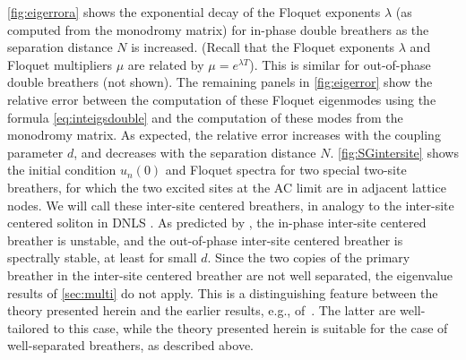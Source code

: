 \documentclass[12pt,reqno]{amsart}
\theoremstyle{definition}
\begin{document}
\cref{fig:eigerrora} shows the exponential decay of the Floquet exponents $\lambda$ (as computed from the monodromy matrix) for in-phase double breathers as the separation distance $N$ is increased. (Recall that the Floquet exponents $\lambda$ and Floquet multipliers $\mu$ are related by $\mu = e^{\lambda T}$).
This is similar for out-of-phase double breathers (not shown). The remaining panels in \cref{fig:eigerror} show the relative error between the computation of these Floquet eigenmodes using the formula \cref{eq:inteigsdouble} and the computation of these modes from the monodromy matrix. As expected, the relative error increases with the coupling parameter $d$, and decreases with the separation distance $N$. \cref{fig:SGintersite} shows the initial condition $u_n(0)$ and Floquet spectra for two special two-site breathers, for which the two excited sites at the AC limit are in adjacent lattice nodes. We will call these inter-site centered breathers, in analogy to the inter-site centered soliton in DNLS \cite{Kevrekidis2009}.
As predicted by \cite{cuevas-maraver2016}, the in-phase inter-site centered breather is unstable, and the out-of-phase inter-site centered breather is spectrally stable, at least for small $d$. Since the two copies of the primary breather in the inter-site centered breather are not well separated, the eigenvalue results of \cref{sec:multi} do not apply. This is a
distinguishing feature between the theory presented herein
and the earlier results, e.g., of~\cites{Archilla2003,Koukouloyannis2009}. The latter are
well-tailored to this case, while the theory presented herein
is suitable for the case of well-separated breathers, as 
described above.
\end{document}
